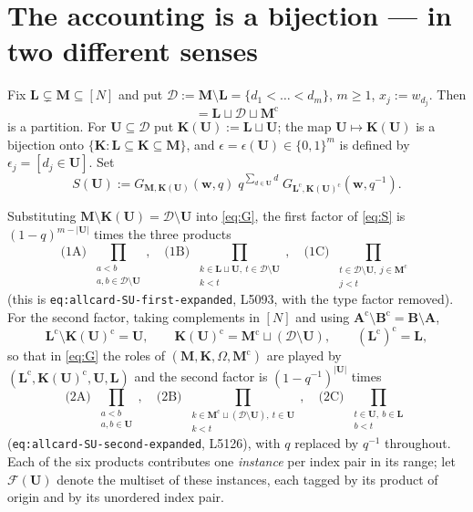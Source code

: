 \documentclass[11pt]{article}
\theoremstyle{plain}
\theoremstyle{definition}
\theoremstyle{remark}
\newcommand{\bM}{\mathbf M}
\newcommand{\bK}{\mathbf K}
\newcommand{\bL}{\mathbf L}
\newcommand{\bU}{\mathbf U}
\newcommand{\bA}{\mathbf A}
\newcommand{\bw}{\mathbf w}
\newcommand{\cD}{\mathcal D}
\newcommand{\cm}{{\mathrm c}}
\newcommand{\Om}{\Omega}
\begin{document}
\section{The accounting is a bijection --- in two different senses}
\label{sec:account}

Fix $\bL\subsetneq\bM\subseteq[N]$ and put
$\cD:=\bM\setminus\bL=\{d_1<\dots<d_m\}$, $m\ge1$, $x_j:=w_{d_j}$. Then
\begin{equation}
[N]=\bL\sqcup\cD\sqcup\bM^\cm
\label{eq:partition}
\end{equation}
is a partition. For $\bU\subseteq\cD$ put $\bK(\bU):=\bL\sqcup\bU$; the map
$\bU\mapsto\bK(\bU)$ is a bijection onto $\{\bK:\bL\subseteq\bK\subseteq\bM\}$, and
$\epsilon=\epsilon(\bU)\in\{0,1\}^m$ is defined by $\epsilon_j=[d_j\in\bU]$. Set
\begin{equation}
S(\bU):=G_{\bM,\bK(\bU)}(\bw,q)\;q^{\sum_{d\in\bU}d}\;
G_{\bL^\cm,\bK(\bU)^\cm}(\bw,q^{-1}).
\label{eq:S}
\end{equation}

Substituting $\bM\setminus\bK(\bU)=\cD\setminus\bU$ into \eqref{eq:G}, the first
factor of \eqref{eq:S} is $(1-q)^{m-|\bU|}$ times the three products
\begin{equation}
\text{(1A) }\!\!\prod_{\substack{a<b\\a,b\in\cD\setminus\bU}}\!\!,\quad
\text{(1B) }\!\!\prod_{\substack{k\in\bL\sqcup\bU,\ t\in\cD\setminus\bU\\k<t}}\!\!,\quad
\text{(1C) }\!\!\prod_{\substack{t\in\cD\setminus\bU,\ j\in\bM^\cm\\j<t}}\!\!
\label{eq:first}
\end{equation}
(this is \texttt{eq:allcard-SU-first-expanded}, L5093, with the type factor
removed). For the second factor, taking complements in $[N]$ and using
$\bA^\cm\setminus\mathbf B^\cm=\mathbf B\setminus\bA$,
\[
\bL^\cm\setminus\bK(\bU)^\cm=\bU,\qquad
\bK(\bU)^\cm=\bM^\cm\sqcup(\cD\setminus\bU),\qquad
(\bL^\cm)^\cm=\bL,
\]
so that in \eqref{eq:G} the roles of $(\bM,\bK,\Om,\bM^\cm)$ are played by
$(\bL^\cm,\bK(\bU)^\cm,\bU,\bL)$ and the second factor is $(1-q^{-1})^{|\bU|}$
times
\begin{equation}
\text{(2A) }\!\!\prod_{\substack{a<b\\a,b\in\bU}}\!\!,\quad
\text{(2B) }\!\!\prod_{\substack{k\in\bM^\cm\sqcup(\cD\setminus\bU),\ t\in\bU\\k<t}}\!\!,\quad
\text{(2C) }\!\!\prod_{\substack{t\in\bU,\ b\in\bL\\b<t}}\!\!
\label{eq:second}
\end{equation}
(\texttt{eq:allcard-SU-second-expanded}, L5126), with $q$ replaced by $q^{-1}$
throughout. Each of the six products contributes one \emph{instance} per index pair
in its range; let $\mathcal F(\bU)$ denote the multiset of these instances, each
tagged by its product of origin and by its unordered index pair.
\end{document}
